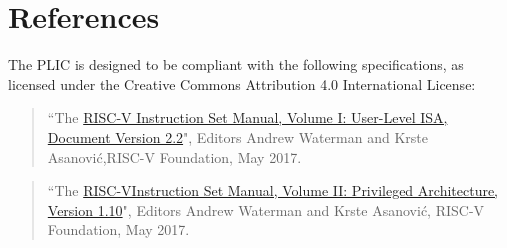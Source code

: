 \chapter{References}

The PLIC is designed to be compliant with the following specifications, as licensed under the Creative Commons Attribution 4.0 International License:

\begin{quote}
	``The \href{https://github.com/riscv/riscv-isa-manual/blob/master/release/riscv-spec-v2.2.pdf}{RISC-V Instruction Set Manual, Volume I: User-Level ISA, Document
	Version 2.2}", Editors Andrew Waterman and Krste Asanović,RISC-V
	Foundation, May 2017.
\end{quote}

\begin{quote}
	``The \href{https://github.com/riscv/riscv-isa-manual/blob/master/release/riscv-privileged-v1.10.pdf}{RISC-VInstruction Set Manual, Volume II: Privileged Architecture,
	Version 1.10}", Editors Andrew Waterman and Krste Asanović, RISC-V
	Foundation, May 2017.
\end{quote}
